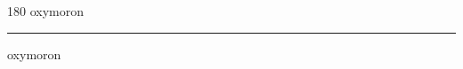 
\begin{frame}
\begin{center}
\begin{turn}{180}
{\fontsize{2.5cm}{1em}\selectfont oxymoron}
\end{turn}
\vspace{1em}\par  
\hrule
\vspace{1em}\par  
{\fontsize{2.5cm}{1em}\selectfont oxymoron}
\end{center}
\end{frame}
